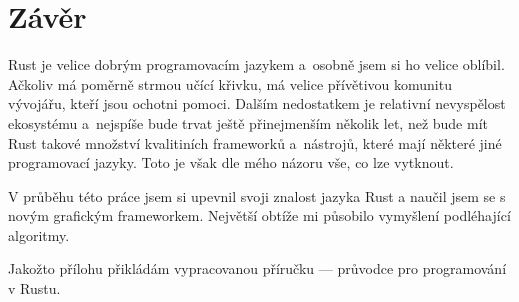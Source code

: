 \documentclass[a4paper, 12pt, twoside]{article} %
\begin{document}
\section{Závěr}
	Rust je velice dobrým programovacím jazykem a~osobně jsem si ho velice oblíbil. Ačkoliv má poměrně strmou učící křivku, má velice přívětivou komunitu vývojářu, kteří jsou ochotni pomoci. Dalším nedostatkem je relativní nevyspělost ekosystému a~nejspíše bude trvat ještě přinejmenším několik let, než bude mít Rust takové množství kvalitiních frameworků a~nástrojů, které mají některé jiné programovací jazyky. Toto je však dle mého názoru vše, co lze vytknout.
	
	V průběhu této práce jsem si upevnil svoji znalost jazyka Rust a naučil jsem se s novým grafickým frameworkem. Největší obtíže mi působilo vymyšlení podléhající algoritmy.
	
	Jakožto přílohu přikládám vypracovanou příručku — průvodce pro programování v Rustu.



\end{document}

